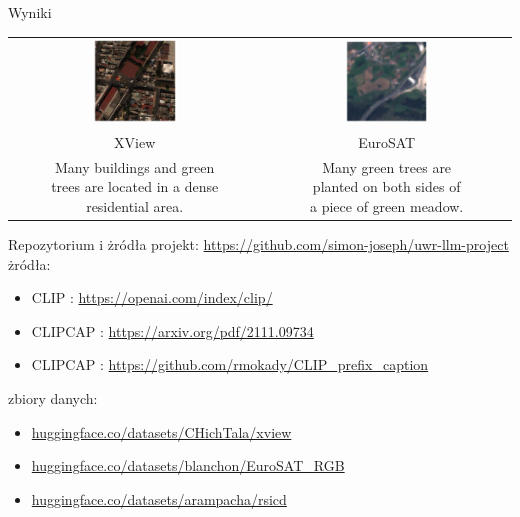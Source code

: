 \documentclass{beamer}
\begin{document}
\begin{frame}{Wyniki}
  \begin{table}[h]
    \centering
    \small
    \begin{tabular}{cc}
      \includegraphics[width=0.35\textwidth]{../img/xview_2.png} & \includegraphics[width=0.35\textwidth]{../img/eurosat_2.png}  \\
      XView &  EuroSAT \\ [1em]
      \makecell{Many buildings and green \\trees are located in a dense\\ residential area.} & \makecell{Many green trees are\\ planted on both sides of\\ a piece of green meadow.}
    \end{tabular}
  \end{table}
\end{frame}

\begin{frame}{Repozytorium i żródła}
  projekt: \url{https://github.com/simon-joseph/uwr-llm-project} \\
  żródła:
  \begin{itemize}
    \item CLIP : \url{https://openai.com/index/clip/}
    \item CLIPCAP : \url{https://arxiv.org/pdf/2111.09734}
    \item CLIPCAP : \url{https://github.com/rmokady/CLIP_prefix_caption}
  \end{itemize}
  zbiory danych:
  \begin{itemize}
    \item \url{huggingface.co/datasets/CHichTala/xview}
    \item \url{huggingface.co/datasets/blanchon/EuroSAT_RGB}
    \item \url{huggingface.co/datasets/arampacha/rsicd}
  \end{itemize}
\end{frame}
\end{document}
